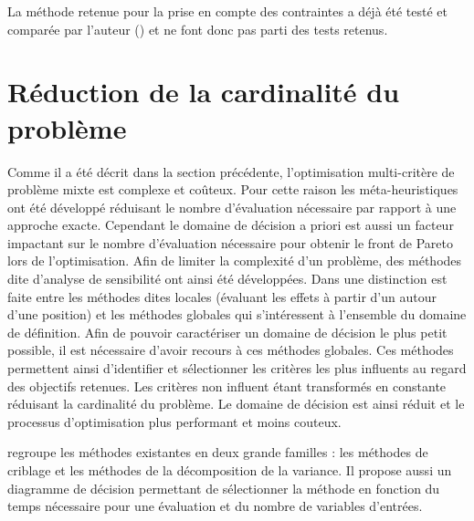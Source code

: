 La méthode retenue pour la prise en compte des contraintes a déjà été testé et
comparée par l’auteur () et ne font donc pas parti des tests
retenus.






\section{Réduction de la cardinalité du problème} %
\label{sec:reduction_de_la_cardinalite_du_probleme}

Comme il a été décrit dans la section précédente, l’optimisation multi-critère de
problème mixte est complexe et coûteux. Pour cette raison les méta-heuristiques
ont été développé réduisant le nombre d’évaluation nécessaire par rapport à une
approche exacte.
Cependant le domaine de décision a priori est aussi un facteur impactant sur le
nombre d’évaluation nécessaire pour obtenir le front de Pareto lors de l’optimisation.
Afin de limiter la complexité d’un problème, des méthodes dite d’analyse de sensibilité
ont ainsi été développées.
Dans \cite{Iooss2011} une distinction est faite entre les méthodes dites locales
(évaluant les effets à partir d’un autour d’une position) et les méthodes globales qui
s’intéressent à l’ensemble du domaine de définition. Afin de pouvoir caractériser
un domaine de décision le plus petit possible, il est nécessaire d’avoir recours à
ces méthodes globales.
Ces méthodes permettent ainsi d’identifier et sélectionner les critères les plus influents
au regard des objectifs retenues. Les critères non influent étant transformés en
constante réduisant la cardinalité du problème. Le domaine de décision est ainsi
réduit et le processus d’optimisation plus performant et moins couteux.

\cite{Iooss2011} regroupe les méthodes existantes en deux grande familles : les
méthodes de criblage et les méthodes de la décomposition de la variance. Il propose
aussi un diagramme de décision permettant de sélectionner la méthode en fonction
du temps nécessaire pour une évaluation et du nombre de variables d’entrées.

